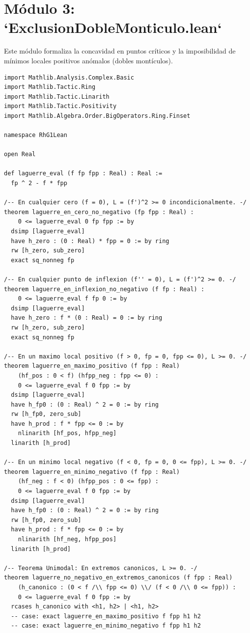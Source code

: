 \documentclass[11pt,a4paper]{article}
\theoremstyle{definition}
\theoremstyle{remark}
\begin{document}
\section{Módulo 3: `ExclusionDobleMonticulo.lean`}

Este módulo formaliza la concavidad en puntos críticos y la imposibilidad de mínimos locales positivos anómalos (dobles montículos).

\begin{lstlisting}[language=Lean4]
import Mathlib.Analysis.Complex.Basic
import Mathlib.Tactic.Ring
import Mathlib.Tactic.Linarith
import Mathlib.Tactic.Positivity
import Mathlib.Algebra.Order.BigOperators.Ring.Finset

namespace RhG1Lean

open Real

def laguerre_eval (f fp fpp : Real) : Real :=
  fp ^ 2 - f * fpp

/-- En cualquier cero (f = 0), L = (f')^2 >= 0 incondicionalmente. -/
theorem laguerre_en_cero_no_negativo (fp fpp : Real) :
    0 <= laguerre_eval 0 fp fpp := by
  dsimp [laguerre_eval]
  have h_zero : (0 : Real) * fpp = 0 := by ring
  rw [h_zero, sub_zero]
  exact sq_nonneg fp

/-- En cualquier punto de inflexion (f'' = 0), L = (f')^2 >= 0. -/
theorem laguerre_en_inflexion_no_negativo (f fp : Real) :
    0 <= laguerre_eval f fp 0 := by
  dsimp [laguerre_eval]
  have h_zero : f * (0 : Real) = 0 := by ring
  rw [h_zero, sub_zero]
  exact sq_nonneg fp

/-- En un maximo local positivo (f > 0, fp = 0, fpp <= 0), L >= 0. -/
theorem laguerre_en_maximo_positivo (f fpp : Real)
    (hf_pos : 0 < f) (hfpp_neg : fpp <= 0) :
    0 <= laguerre_eval f 0 fpp := by
  dsimp [laguerre_eval]
  have h_fp0 : (0 : Real) ^ 2 = 0 := by ring
  rw [h_fp0, zero_sub]
  have h_prod : f * fpp <= 0 := by
    nlinarith [hf_pos, hfpp_neg]
  linarith [h_prod]

/-- En un minimo local negativo (f < 0, fp = 0, 0 <= fpp), L >= 0. -/
theorem laguerre_en_minimo_negativo (f fpp : Real)
    (hf_neg : f < 0) (hfpp_pos : 0 <= fpp) :
    0 <= laguerre_eval f 0 fpp := by
  dsimp [laguerre_eval]
  have h_fp0 : (0 : Real) ^ 2 = 0 := by ring
  rw [h_fp0, zero_sub]
  have h_prod : f * fpp <= 0 := by
    nlinarith [hf_neg, hfpp_pos]
  linarith [h_prod]

/-- Teorema Unimodal: En extremos canonicos, L >= 0. -/
theorem laguerre_no_negativo_en_extremos_canonicos (f fpp : Real)
    (h_canonico : (0 < f /\\ fpp <= 0) \\/ (f < 0 /\\ 0 <= fpp)) :
    0 <= laguerre_eval f 0 fpp := by
  rcases h_canonico with <h1, h2> | <h1, h2>
  -- case: exact laguerre_en_maximo_positivo f fpp h1 h2
  -- case: exact laguerre_en_minimo_negativo f fpp h1 h2


\end{lstlisting}
\end{document}
